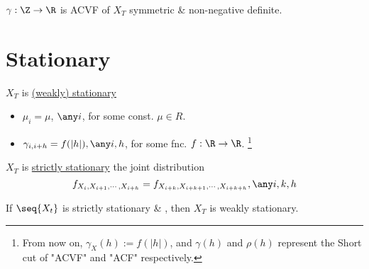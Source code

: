 \begin{theorem}
$\gamma : \Z \rightarrow \R$ is ACVF of $X_T$ \iff symmetric \& non-negative definite.
\end{theorem}

\section{Stationary}
\begin{definition}
$X_T$ is \uline{(weakly) stationary} \iff 
\begin{itemize}
    \item $\mu_i = \mu$, $\any i$, for some const. $\mu \in R$.
    \item $\gamma_{i,i+h} = f(|h|), \any i,h$, for some fnc. $f: \R \rightarrow \R$.
    \footnote{From now on, $\gamma_X (h) := f(|h|)$, and $\gamma(h)$ and $\rho(h)$ represent the Short cut of "ACVF" and "ACF" respectively.}
\end{itemize}
\end{definition}


\begin{definition}
$X_T$ is \uline{strictly stationary} \iff the joint distribution
\[
    f_{X_i,X_{i+1},\cdots,X_{i+h}} = f_{X_{i+k},X_{i+k+1},\cdots,X_{i+k+h}}, \any i, k, h
\]
\end{definition}


\begin{theorem}
If $\seq{X_t}$ is strictly stationary \& , then $X_T$ is weakly stationary.
\end{theorem}

